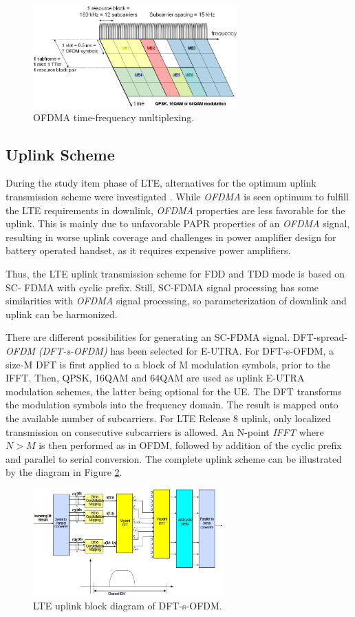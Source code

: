 \begin{figure}[htbp]
    \centering
    \includegraphics[width=0.70\textwidth]{./figures/downlink_channels}
    \caption{ OFDMA time-frequency multiplexing.
    \label{fig:dlchann}}
\end{figure}


\subsection{Uplink Scheme}%

During the study item phase of LTE, alternatives for the optimum uplink
transmission scheme were investigated \cite{umtslte}. While \textit{OFDMA} is
seen optimum to fulfill the LTE requirements in downlink, \textit{OFDMA}
properties are less favorable for the uplink. This is mainly due to unfavorable
PAPR properties of an \textit{OFDMA} signal, resulting in worse uplink coverage
and challenges in power amplifier design for battery operated handset, as it
requires expensive power amplifiers.

Thus, the LTE uplink transmission scheme for FDD and TDD mode is based on SC-
FDMA with cyclic prefix. Still, SC-FDMA signal processing has some similarities
with \textit{OFDMA} signal processing, so parameterization of downlink and
uplink can be harmonized.

There are different possibilities for generating an SC-FDMA signal. DFT-spread-
\textit{OFDM} \textit{(DFT-s-OFDM)} has been selected for E-UTRA. For
DFT-s-OFDM, a size-M DFT is first applied to a block of M modulation symbols,
prior to the IFFT. Then, QPSK, 16QAM and 64QAM are used as uplink E-UTRA
modulation schemes, the latter being optional for the UE. The DFT transforms the
modulation symbols into the frequency domain. The result is mapped onto the
available number of subcarriers. For LTE Release 8 uplink, only localized
transmission on consecutive subcarriers is allowed. An N-point \textit{IFFT}
where $N>M$ is then performed as in OFDM, followed by addition of the cyclic
prefix and parallel to serial conversion. The complete uplink scheme can be
illustrated by the diagram in Figure \ref{fig:uplinkbd}.

\begin{figure}[htbp]
    \centering
    \includegraphics[width=0.65\textwidth]{./figures/uplink_scheme}
    \caption{ LTE uplink block diagram of DFT-s-OFDM.
    \label{fig:uplinkbd}}
\end{figure}
